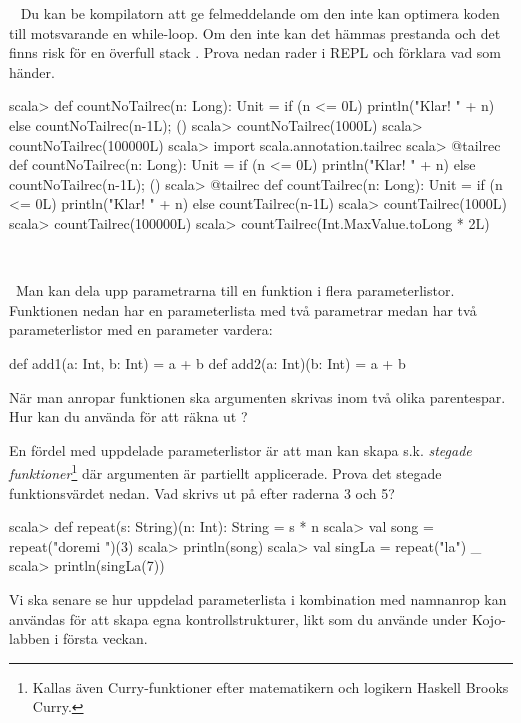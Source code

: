 \Task  \what~  Du kan be kompilatorn att ge felmeddelande om den inte kan optimera koden till motsvarande en while-loop. Om den inte kan det hämmas prestanda och det finns risk för en överfull stack . Prova nedan rader i REPL och förklara vad som händer.
\begin{REPL}
scala> def countNoTailrec(n: Long): Unit =
         if (n <= 0L) println("Klar! " + n) else {countNoTailrec(n-1L); ()}
scala> countNoTailrec(1000L)
scala> countNoTailrec(100000L)
scala> import scala.annotation.tailrec
scala> @tailrec def countNoTailrec(n: Long): Unit =
         if (n <= 0L) println("Klar! " + n) else {countNoTailrec(n-1L); ()}
scala> @tailrec def countTailrec(n: Long): Unit =
         if (n <= 0L) println("Klar! " + n) else countTailrec(n-1L)
scala> countTailrec(1000L)
scala> countTailrec(100000L)
scala> countTailrec(Int.MaxValue.toLong * 2L)
\end{REPL}

\SOLUTION

\TaskSolved \what~\TODO %

\QUESTEND





\QUESTBEGIN

\Task \what~Man kan dela upp parametrarna till en funktion i flera parameterlistor. Funktionen  nedan har en parameterlista med två parametrar medan  har två parameterlistor med en parameter vardera:
\begin{Code}
  def add1(a: Int, b: Int) = a + b
  def add2(a: Int)(b: Int) = a + b
\end{Code}

\Subtask  När man anropar funktionen  ska argumenten skrivas inom två olika parentespar. Hur kan du använda  för att räkna ut ?

\Subtask En fördel med uppdelade parameterlistor är att man kan skapa s.k. \emph{stegade funktioner}\footnote{Kallas även Curry-funktioner efter matematikern och logikern Haskell Brooks Curry.} där argumenten är partiellt applicerade. Prova det stegade funktionsvärdet  nedan. Vad skrivs ut på efter raderna 3 och 5?

\begin{REPL}
scala> def repeat(s: String)(n: Int): String = s * n
scala> val song = repeat("doremi ")(3)
scala> println(song)
scala> val singLa = repeat("la") _
scala> println(singLa(7))
\end{REPL}
\noindent Vi ska senare se hur uppdelad parameterlista i kombination med namnanrop kan användas för att skapa egna kontrollstrukturer, likt  som du använde under Kojo-labben i första veckan.
\SOLUTION

